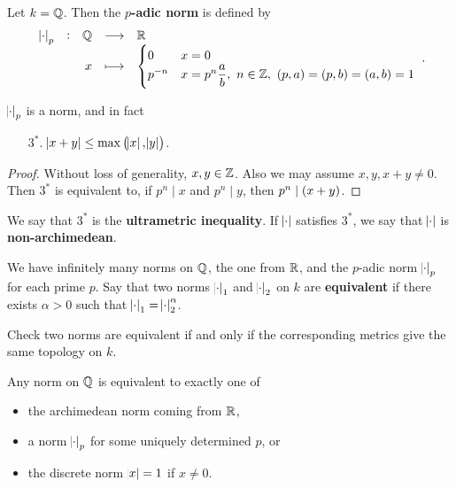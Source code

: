 \begin{definition}
Let $ k = \mathbb{Q} $. Then the \textbf{$ p $-adic norm} is defined by
$$
\function[\abs{\cdot}_p]{\QQ}{\RR}{x}{
\begin{cases}
0 & x = 0 \\
p^{-n} & x = p^n\dfrac{a}{b}, \ n \in \ZZ, \ \br{p, a} = \br{p, b} = \br{a, b} = 1
\end{cases}
}.
$$
\end{definition}

\begin{lemma}
$ \abs{\cdot}_p $ is a norm, and in fact
\begin{enumerate}
\item[$ 3^* $.] $ \abs{x + y} \le \max\br{\abs{x}, \abs{y}} $.
\end{enumerate}
\end{lemma}

\begin{proof}
Without loss of generality, $ x, y \in \mathbb{Z} $. Also we may assume $ x, y, x + y \ne 0 $. Then $ 3^* $ is equivalent to, if $ p^n \mid x $ and $ p^n \mid y $, then $ p^n \mid \br{x + y} $.
\end{proof}

\begin{definition}
We say that $ 3^* $ is the \textbf{ultrametric inequality}. If $ \abs{\cdot} $ satisfies $ 3^* $, we say that $ \abs{\cdot} $ is \textbf{non-archimedean}.
\end{definition}

We have infinitely many norms on $ \mathbb{Q} $, the one from $ \mathbb{R} $, and the $ p $-adic norm $ \abs{\cdot}_p $ for each prime $ p $. Say that two norms $ \abs{\cdot}_1 $ and $ \abs{\cdot}_2 $ on $ k $ are \textbf{equivalent} if there exists $ \alpha > 0 $ such that $ \abs{\cdot}_1 = \abs{\cdot}_2^\alpha $.

\begin{exercise*}
Check two norms are equivalent if and only if the corresponding metrics give the same topology on $ k $.
\end{exercise*}

\begin{theorem}
Any norm on $ \mathbb{Q} $ is equivalent to exactly one of
\begin{itemize}
\item the archimedean norm coming from $ \mathbb{R} $,
\item a norm $ \abs{\cdot}_p $ for some uniquely determined $ p $, or
\item the discrete norm $ \abs{x} = 1 $ if $ x \ne 0 $.
\end{itemize}
\end{theorem}

